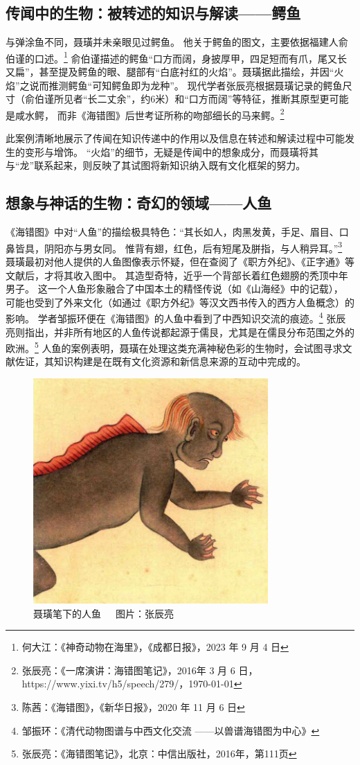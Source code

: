 \documentclass{source/Paper}
\begin{document}
\subsection{传闻中的生物：被转述的知识与解读——鳄鱼}
与弹涂鱼不同，聂璜并未亲眼见过鳄鱼。
他关于鳄鱼的图文，主要依据福建人俞伯谨的口述。\footnote{何大江：《神奇动物在海里》，《成都日报》，2023 年 9 月 4 日}
俞伯谨描述的鳄鱼“口方而阔，身披厚甲，四足短而有爪，尾又长又扁”，甚至提及鳄鱼的眼、腿部有“白底衬红的火焰”。聂璜据此描绘，并因“火焰”之说而推测鳄鱼“可知鳄鱼即为龙种”。
现代学者张辰亮根据聂璜记录的鳄鱼尺寸（俞伯谨所见者“长二丈余”，约6米）和“口方而阔”等特征，推断其原型更可能是咸水鳄，
而非《海错图》后世考证所称的吻部细长的马来鳄。\footnote{张辰亮：《一席演讲：海错图笔记》，2016年 3 月 6 日，https://www.yixi.tv/h5/speech/279/，\today}

此案例清晰地展示了传闻在知识传递中的作用以及信息在转述和解读过程中可能发生的变形与增饰。
“火焰”的细节，无疑是传闻中的想象成分，而聂璜将其与“龙”联系起来，则反映了其试图将新知识纳入既有文化框架的努力。
\subsection{想象与神话的生物：奇幻的领域——人鱼}
《海错图》中对“人鱼”的描绘极具特色：“其长如人，肉黑发黄，手足、眉目、口鼻皆具，阴阳亦与男女同。
惟背有翅，红色，后有短尾及胼指，与人稍异耳。”\footnote{陈茜：《海错图》，《新华日报》，2020 年 11 月 6 日}
聂璜最初对他人提供的人鱼图像表示怀疑，但在查阅了《职方外纪》、《正字通》等文献后，才将其收入图中。
其造型奇特，近乎一个背部长着红色翅膀的秃顶中年男子。
这一个人鱼形象融合了中国本土的精怪传说（如《山海经》中的记载），
可能也受到了外来文化（如通过《职方外纪》等汉文西书传入的西方人鱼概念）的影响。
学者邹振环便在《海错图》的人鱼中看到了中西知识交流的痕迹。\footnote{邹振环：《清代动物图谱与中西文化交流 ——以\textlangle 兽谱\textrangle \textlangle 海错图\textrangle 为中心》}
张辰亮则指出，并非所有地区的人鱼传说都起源于儒艮，尤其是在儒艮分布范围之外的欧洲。\footnote{张辰亮：《海错图笔记》，北京：中信出版社，2016年，第111页}
人鱼的案例表明，聂璜在处理这类充满神秘色彩的生物时，会试图寻求文献佐证，其知识构建是在既有文化资源和新信息来源的互动中完成的。
\begin{figure}[H]
    \centering
    \includegraphics[width=0.8\textwidth]{fig/人鱼.png}
    \caption{聂璜笔下的人鱼~~~图片：张辰亮}
    \label{fig:人鱼}
\end{figure}
\end{document}
